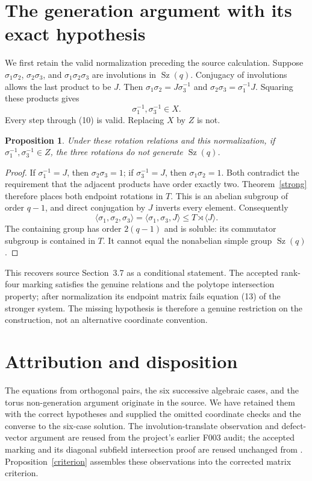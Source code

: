 \documentclass[11pt,a4paper]{article}
\newtheorem{proposition}[theorem]{Proposition}
\newcommand{\Sz}{\operatorname{Sz}}
\newcommand{\gen}[1]{\langle#1\rangle}
\begin{document}
\section{The generation argument with its exact hypothesis}
We first retain the valid normalization preceding the source
calculation. Suppose $\sigma_1\sigma_2$, $\sigma_2\sigma_3$,
and $\sigma_1\sigma_2\sigma_3$ are involutions in $\Sz(q)$.
Conjugacy of involutions allows the last product to be $J$.
Then $\sigma_1\sigma_2=J\sigma_3^{-1}$ and
$\sigma_2\sigma_3=\sigma_1^{-1}J$. Squaring these products gives
\[
 \sigma_1^{-1},\sigma_3^{-1}\in X.
 \tag{10}
\]
Every step through (10) is valid. Replacing $X$ by $Z$ is not.

\begin{proposition}\label{nongeneration}
Under these rotation relations and this normalization, if
$\sigma_1^{-1},\sigma_3^{-1}\in Z$, the three rotations do not
generate $\Sz(q)$.
\end{proposition}
\begin{proof}
If $\sigma_1^{-1}=J$, then $\sigma_2\sigma_3=1$; if
$\sigma_3^{-1}=J$, then $\sigma_1\sigma_2=1$. Both contradict
the requirement that the adjacent products have order exactly two.
Theorem~\ref{strong} therefore places both endpoint rotations in
$T$. This is an abelian subgroup of order $q-1$, and direct
conjugation by $J$ inverts every element. Consequently
\[
 \gen{\sigma_1,\sigma_2,\sigma_3}
 =\gen{\sigma_1,\sigma_3,J}\leq T\rtimes\gen J.
\]
The containing group has order $2(q-1)$ and is soluble: its
commutator subgroup is contained in $T$. It cannot equal the
nonabelian simple group $\Sz(q)$.
\end{proof}

This recovers source Section~3.7 as a conditional statement.
The accepted rank-four marking satisfies the genuine relations
and the polytope intersection property; after normalization its
endpoint matrix fails equation (13) of the stronger system.
The missing hypothesis is therefore a genuine restriction on the
construction, not an alternative coordinate convention.

\section{Attribution and disposition}
The equations from orthogonal pairs, the six successive algebraic
cases, and the torus non-generation argument originate in the source.
We have retained them with the correct hypotheses and supplied the
omitted coordinate checks and the converse to the six-case solution.
The involution-translate observation and defect-vector argument are
reused from the project's earlier F003 audit; the accepted marking
and its diagonal subfield intersection proof are reused unchanged
from \cite{Counterexample}. Proposition~\ref{criterion} assembles
these observations into the corrected matrix criterion.
\end{document}
